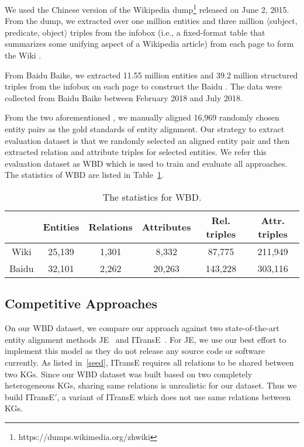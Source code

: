 	We used the Chinese version of the Wikipedia dump\footnote{https://dumps.wikimedia.org/zhwiki} released on June 2, 2015.
    From the dump, we extracted over one million entities and three million $\langle$subject, predicate, object$\rangle$ triples from the infobox (i.e., a fixed-format table that summarizes some unifying aspect of a Wikipedia article) from each page to form the Wiki \KG.
	
	 From Baidu Baike, we extracted 11.55 million entities and 39.2 million structured triples from the infobox on each page to construct the Baidu \KG. 
	The data were collected from Baidu Baike between February 2018 and July 2018.

	
	 From the two aforementioned \KGs, we manually aligned 16,969 randomly chosen entity pairs as the gold standards of entity alignment. 
	Our strategy to extract evaluation dataset is that we randomly selected an aligned entity pair and then extracted relation and attribute triples for selected entities. 
	We refer this evaluation dataset as WBD which is used to train and evaluate all approaches. The statistics of WBD are listed in Table~\ref{dataset}.
	


	\begin{table}
	\centering
	\scriptsize
	\begin{tabular}{c|ccccc}
		\toprule
		&\bf  Entities &\bf  Relations &\bf  Attributes &\bf  Rel. triples &\bf  Attr. triples \\
		\midrule
		Wiki & 25,139 & 1,301 & 8,332 & 87,775 & 211,949 \\ 
		Baidu & 32,101 & 2,262 & 20,263 & 143,228 & 303,116 \\
		\bottomrule
	\end{tabular}
	\caption{The statistics for WBD.}
	\label{dataset}
\end{table}


	\subsection{Competitive Approaches}
	On our WBD dataset, we compare our approach against two state-of-the-art entity alignment methods JE~\cite{hao2016joint} and ITransE~\cite{zhu2017iterative}. For JE, we use our best effort to implement this model as they do not release any source code or software currently.  As listed in~\ref{seed}, ITransE requires all relations to be shared between two KGs. Since our WBD dataset was built based on two completely heterogeneous KGs, sharing same relations is unrealistic for our dataset. Thus we build ITransE$'$, a variant of ITransE which does not use same relations between KGs.
	
